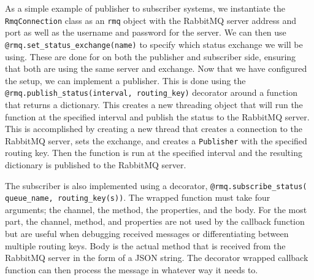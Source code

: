 As a simple example of publisher to subscriber systems, we instantiate the \texttt{RmqConnection} class as an \texttt{rmq} object with the RabbitMQ server address and port as well as the username and password for the server.
We can then use \texttt{@rmq.set\_status\_exchange(name)} to specify which status exchange we will be using. 
These are done for on both the publisher and subscriber side, ensuring that both are using the same server and exchange. 
Now that we have configured the setup, we can implement a publisher.
This is done using the \texttt{@rmq.publish\_status(interval, routing\_key)} decorator around a function that returns a dictionary.
This creates a new threading object that will run the function at the specified interval and publish the status to the RabbitMQ server.
This is accomplished by creating a new thread that creates a connection to the RabbitMQ server, sets the exchange, and creates a \texttt{Publisher} with the specified routing key.
Then the function is run at the specified interval and the resulting dictionary is published to the RabbitMQ server.

The subscriber is also implemented using a decorator, \texttt{@rmq.subscribe\_status( queue\_name, routing\_key(s))}.
The wrapped function must take four arguments; the channel, the method, the properties, and the body.
For the most part, the channel, method, and properties are not used by the callback function but are useful when debugging received messages or differentiating between multiple routing keys.
Body is the actual method that is received from the RabbitMQ server in the form of a JSON string. 
The decorator wrapped callback function can then process the message in whatever way it needs to.

